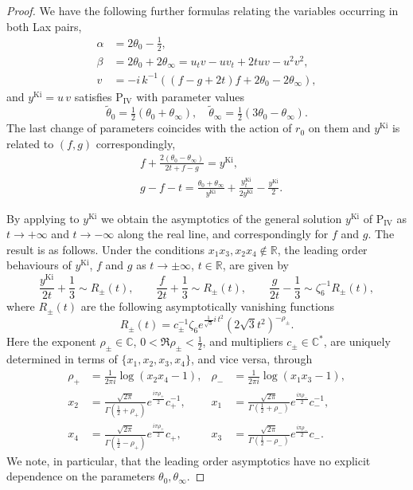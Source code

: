 \documentclass[a4paper,reqno]{amsart}
\numberwithin{equation}{section}
\newcommand\Pfour{\textrm{P}_{\textrm{IV}}}
\numberwithin{equation}{section}
\begin{document}
\begin{proof}
We have the following further formulas relating the variables occurring in both Lax pairs,
\begin{align*}
    \alpha&=2\theta_0-\frac{1}{2},\\
    \beta&=2\theta_0+2\theta_\infty=u_tv-uv_t+2tuv-u^2v^2,\\
    v&=-i\,k^{-1}((f-g+2t)f+2\theta_0-2\theta_\infty),
\end{align*}
and $y^{\text{Ki}}=u\,v$ satisfies $\Pfour$ with parameter values $$\widetilde{\theta}_0=\tfrac{1}{2}(\theta_0+\theta_\infty),\quad 
\widetilde{\theta}_\infty=\tfrac{1}{2}(3\theta_0-\theta_\infty).$$
The last change of parameters coincides with the action of $r_0$ on them and $y^{\text{Ki}}$ is related to $(f,g)$ correspondingly,
\begin{align*}
    &f+\frac{2(\theta_0-\theta_\infty)}{2t+f-g}=y^{\text{Ki}},\\
    &g-f-t=\frac{\theta_0+\theta_\infty}{y^{\text{Ki}}}+\frac{y_t^{\text{Ki}}}{2y^{\text{Ki}}}-\frac{y^{\text{Ki}}}{2}.
\end{align*}

By applying \cite[Th. 4(ii)]{kapaev1996} to $y^{\text{Ki}}$
we obtain the asymptotics of the general solution $y^{\text{Ki}}$ of $\Pfour$ as $t\rightarrow +\infty$ and $t\rightarrow-\infty$ along the real line, and correspondingly for $f$ and $g$. The result is as follows. Under the conditions $ x_1x_3,x_2x_4\notin \mathbb{R}$,
the leading order behaviours of $y^{\text{Ki}}$, $f$ and $g$ as $t\rightarrow \pm\infty$, $t\in\mathbb{R}$, are given by 
\begin{equation}\label{eq:kap_asymptotics}
    \frac{y^{\text{Ki}}}{2t}+\frac{1}{3}\sim R_\pm(t),\qquad
    \frac{f}{2t}+\frac{1}{3}\sim R_\pm(t), \qquad
    \frac{g}{2t}-\frac{1}{3}\sim \zeta_6^{-1}R_\pm(t),
\end{equation}
where $R_\pm(t)$ are the following asymptotically vanishing functions
\begin{equation*}
    R_\pm(t)=c_\pm^{-1}\zeta_6e^{\frac{1}{\sqrt{3}}i\,t^2}(2\sqrt{3}t^2)^{-\rho_\pm}.
\end{equation*}
Here the exponent $\rho_\pm\in\mathbb{C}$, $0<\Re \rho_\pm<\frac{1}{2}$, and multipliers $c_\pm\in\mathbb{C}^*$, are uniquely determined in terms of $\{x_1,x_2,x_3,x_4\}$, and vice versa, through
\begin{align*}
    \rho_+&=\frac{1}{2\pi i}\log(x_2x_4-1), &  \rho_-&=\frac{1}{2\pi i}\log(x_1x_3-1),\\
    x_2&=\frac{\sqrt{2\pi}}{\Gamma(\frac{1}{2}+\rho_+)} e^{\frac{i\pi\rho_+}{2}}c_+^{-1}, &     x_1&=\frac{\sqrt{2\pi}}{\Gamma(\frac{1}{2}+\rho_-)} e^{\frac{i\pi\rho_-}{2}}c_-^{-1},\\
    x_4&=\frac{\sqrt{2\pi}}{\Gamma(\frac{1}{2}-\rho_+)} e^{\frac{i\pi\rho_+}{2}}c_+, &  x_3&=\frac{\sqrt{2\pi}}{\Gamma(\frac{1}{2}-\rho_-)} e^{\frac{i\pi\rho_-}{2}}c_-.
\end{align*}
We note, in particular, that the leading order asymptotics have no explicit dependence on the parameters $\theta_0,\theta_\infty$.


\end{proof}
\end{document}
